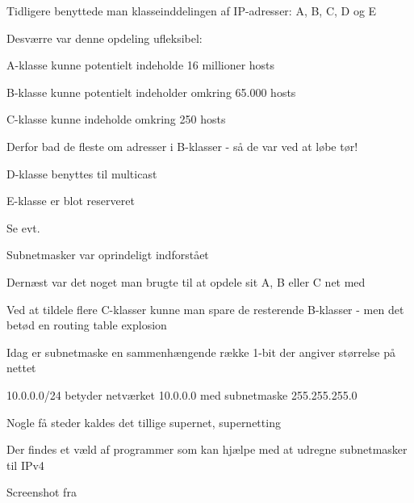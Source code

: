 \documentclass[Screen16to9,17pt,footrule]{foils}
\begin{document}
\begin{list1}
\item Tidligere benyttede man klasseinddelingen af IP-adresser: A, B, C, D og E
\item Desværre var denne opdeling ufleksibel:
\begin{list2}
\item A-klasse kunne potentielt indeholde 16 millioner hosts
\item B-klasse kunne potentielt indeholder omkring 65.000 hosts
\item C-klasse kunne indeholde omkring 250 hosts
\end{list2}
\item Derfor bad de fleste om adresser i B-klasser - så de var ved at løbe tør!
\item D-klasse benyttes til multicast
\item E-klasse er blot reserveret
\item Se evt. 
\end{list1}




\begin{list1}
\item Subnetmasker var oprindeligt indforstået
\item Dernæst var det noget man brugte til at opdele sit A, B eller C net med
\item Ved at tildele flere C-klasser kunne man spare de resterende B-klasser - men det betød en routing table explosion
\item Idag er subnetmaske en sammenhængende række 1-bit der angiver størrelse på nettet
\item 10.0.0.0/24 betyder netværket 10.0.0.0 med subnetmaske 255.255.255.0
\item Nogle få steder kaldes det tillige supernet, supernetting
\end{list1}




\begin{list1}
\item Der findes et væld af programmer som kan hjælpe med at udregne
subnetmasker til IPv4
\item Screenshot fra 
\end{list1}
\end{document}
